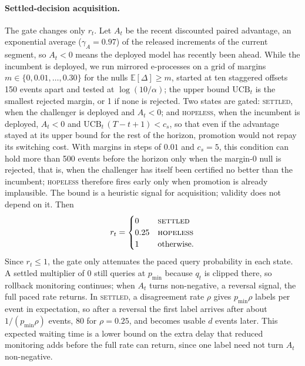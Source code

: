 \documentclass[10pt]{article}
\begin{document}
\paragraph{Settled-decision acquisition.} The gate changes only $r_t$. Let
$A_t$ be the recent discounted paired advantage, an exponential average ($\gamma_A=0.97$) of the
released increments of the current segment, so $A_t<0$ means the deployed model has recently been
ahead. While the incumbent is deployed, we run mirrored e-processes on a grid of margins
$m\in\{0,0.01,\dots,0.30\}$ for the nulls $\mathbb{E}[\Delta]\ge m$, started at ten staggered offsets 150 events apart and
tested at $\log(10/\alpha)$; the upper bound $\mathrm{UCB}_t$ is the smallest rejected margin, or
1 if none is rejected. Two states are gated:
\textsc{settled}, when the challenger is deployed and $A_t<0$; and \textsc{hopeless}, when the
incumbent is deployed, $A_t<0$ and $\mathrm{UCB}_t\,(T-t+1)<c_s$, so that even if the advantage
stayed at its upper bound for the rest of the horizon, promotion would not repay its switching
cost. With margins in steps of $0.01$ and $c_s=5$, this condition can hold more than 500 events
before the horizon only when the margin-0 null is rejected, that is, when the challenger has itself
been certified no better than the incumbent; \textsc{hopeless} therefore fires early only when
promotion is already implausible. The bound is a heuristic signal for acquisition; validity does
not depend on it. Then
\begin{equation}\label{eq:rule}
  r_t=\begin{cases}
    0 & \textsc{settled}\\
    0.25 & \textsc{hopeless}\\
    1 & \text{otherwise.}
  \end{cases}
\end{equation}
Since $r_t\le 1$, the gate only attenuates the paced query probability in each state. A settled
multiplier of $0$ still queries at $p_{\min}$ because $q_t$ is clipped there, so rollback
monitoring continues; when $A_t$ turns non-negative, a reversal signal, the full paced rate
returns. In \textsc{settled}, a disagreement rate $\rho$ gives $p_{\min}\rho$ labels per event in
expectation, so after a reversal the first label arrives after about $1/(p_{\min}\rho)$ events,
80 for $\rho=0.25$, and becomes usable $d$ events later. This expected waiting time is a lower
bound on the extra delay that reduced monitoring adds before the full rate can return, since one
label need not turn $A_t$ non-negative.
\end{document}
